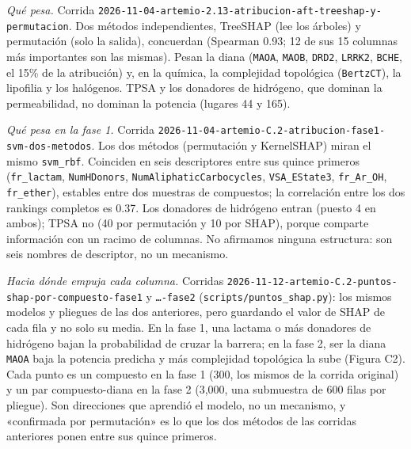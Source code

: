 \documentclass[letterpaper,11pt]{article}
\begin{document}
\emph{Qué pesa.} Corrida \texttt{2026-\allowbreak{}11-\allowbreak{}04-\allowbreak{}artemio-\allowbreak{}2.13-\allowbreak{}atribucion-\allowbreak{}aft-\allowbreak{}treeshap-\allowbreak{}y-\allowbreak{}permutacion}. Dos métodos independientes, TreeSHAP (lee los árboles) y permutación (solo la salida), concuerdan (Spearman 0.93; 12 de sus 15 columnas más importantes son las mismas). Pesan la diana (\texttt{MAOA}, \texttt{MAOB}, \texttt{DRD2}, \texttt{LRRK2}, \texttt{BCHE}, el 15\% de la atribución) y, en la química, la complejidad topológica (\texttt{BertzCT}), la lipofilia y los halógenos. TPSA y los donadores de hidrógeno, que dominan la permeabilidad, no dominan la potencia (lugares 44 y 165).

\emph{Qué pesa en la fase 1.} Corrida \texttt{2026-\allowbreak{}11-\allowbreak{}04-\allowbreak{}artemio-\allowbreak{}C.2-\allowbreak{}atribucion-\allowbreak{}fase1-\allowbreak{}svm-\allowbreak{}dos-\allowbreak{}metodos}. Los dos métodos (permutación y KernelSHAP) miran el mismo \texttt{svm\_rbf}. Coinciden en seis descriptores entre sus quince primeros (\texttt{fr\_lactam}, \texttt{NumHDonors}, \texttt{NumAliphaticCarbocycles}, \texttt{VSA\_EState3}, \texttt{fr\_Ar\_OH}, \texttt{fr\_ether}), estables entre dos muestras de compuestos; la correlación entre los dos rankings completos es 0.37. Los donadores de hidrógeno entran (puesto 4 en ambos); TPSA no (40 por permutación y 10 por SHAP), porque comparte información con un racimo de columnas. No afirmamos ninguna estructura: son seis nombres de descriptor, no un mecanismo.

\emph{Hacia dónde empuja cada columna.} Corridas \texttt{2026-\allowbreak{}11-\allowbreak{}12-\allowbreak{}artemio-\allowbreak{}C.2-\allowbreak{}puntos-\allowbreak{}shap-\allowbreak{}por-\allowbreak{}compuesto-\allowbreak{}fase1} y \texttt{…-fase2} (\texttt{scripts/puntos\_shap.py}): los mismos modelos y pliegues de las dos anteriores, pero guardando el valor de SHAP de cada fila y no solo su media. En la fase 1, una lactama o más donadores de hidrógeno bajan la probabilidad de cruzar la barrera; en la fase 2, ser la diana \texttt{MAOA} baja la potencia predicha y más complejidad topológica la sube (Figura C2). Cada punto es un compuesto en la fase 1 (300, los mismos de la corrida original) y un par compuesto-diana en la fase 2 (3,000, una submuestra de 600 filas por pliegue). Son direcciones que aprendió el modelo, no un mecanismo, y «confirmada por permutación» es lo que los dos métodos de las corridas anteriores ponen entre sus quince primeros.
\end{document}

